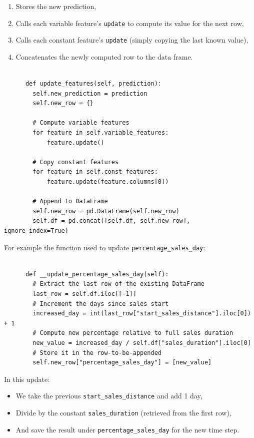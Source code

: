\documentclass[a4paper,12pt]{report}  %
\begin{document}
\begin{enumerate}
	\item Stores the new prediction,
	\item Calls each variable feature’s \texttt{update} to compute its value for the next row,
	\item Calls each constant feature’s \texttt{update} (simply copying the last known value),
	\item Concatenates the newly computed row to the data frame.
\end{enumerate}

\begin{verbatim}

      def update_features(self, prediction):
        self.new_prediction = prediction
        self.new_row = {}

        # Compute variable features
        for feature in self.variable_features:
            feature.update()

        # Copy constant features
        for feature in self.const_features:
            feature.update(feature.columns[0])

        # Append to DataFrame
        self.new_row = pd.DataFrame(self.new_row)
        self.df = pd.concat([self.df, self.new_row], ignore_index=True)

      \end{verbatim}
For example  the function used to update \texttt{percentage\_sales\_day}:

\begin{verbatim}

      def __update_percentage_sales_day(self):
        # Extract the last row of the existing DataFrame
        last_row = self.df.iloc[[-1]]
        # Increment the days since sales start
        increased_day = int(last_row["start_sales_distance"].iloc[0]) + 1
        # Compute new percentage relative to full sales duration
        new_value = increased_day / self.df["sales_duration"].iloc[0]
        # Store it in the row-to-be-appended
        self.new_row["percentage_sales_day"] = [new_value]
      \end{verbatim}

\noindent In this update:
\begin{itemize}
	\item We take the previous \texttt{start\_sales\_distance} and add 1 day,
	\item Divide by the constant \texttt{sales\_duration} (retrieved from the first row),
	\item And save the result under \texttt{percentage\_sales\_day} for the new time step.
\end{itemize}
\end{document}
